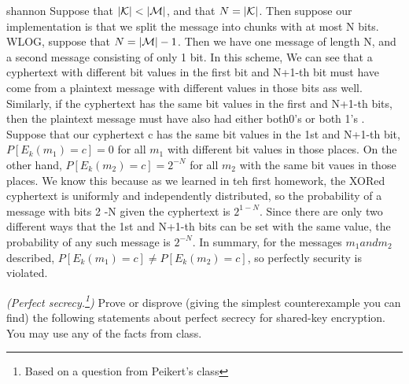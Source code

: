 \begin{questions}
  \begin{mysolution}{shannon}
		Suppose that $|\mathcal{K}| < |\mathcal{M}|$, and that $N = |\mathcal{K}|$. Then suppose our implementation is that we split the message into chunks with at most N bits. WLOG, suppose that $N = |\mathcal{M}|-1$. Then we have one message of length N, and a second message consisting of only 1 bit. In this scheme, We can see that a cyphertext with different bit values in the first bit and N+1-th bit must have come from a plaintext message with different values in those bits ass well. Similarly, if the cyphertext has the same bit values in the first and N+1-th bits, then the plaintext message must have also had either both0's or both 1's . Suppose that our cyphertext c has the same bit values in the 1st and N+1-th bit, $P[E_k(m_1)= c] =0$ for all $m_1$ with different bit values in those places. On the other hand,  $P[E_k(m_2)= c] =2^{-N}$ for all $m_2$ with the same bit vaues in those places. We know this because as we learned in teh first homework, the XORed cyphertext is uniformly and independently distributed, so the probability of a message with bits 2 -N given the cyphertext is $2^{1-N}$. Since there are only two different ways that the 1st and N+1-th bits can be set with the same value, the probability of any such message is $2^{-N}$. In summary, for the messages $m_1 and m_2$ described, $P[E_k(m_1)= c] \neq P[E_k(m_2)= c]$, so perfectly security is violated. 
  \end{mysolution}


  \question
	\emph{(Perfect secrecy.\footnote{Based on a question from Peikert's class\label{fn:peikert}})}  Prove or disprove (giving the
  simplest counterexample you can find) the following statements about
  perfect secrecy for shared-key encryption.  You may use any of the
  facts from class.

\end{questions}
